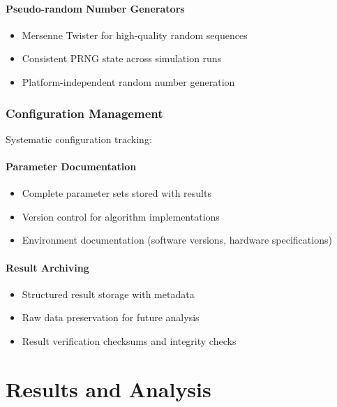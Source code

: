 \subsubsection{Pseudo-random Number Generators}
\begin{itemize}
\item Mersenne Twister for high-quality random sequences
\item Consistent PRNG state across simulation runs
\item Platform-independent random number generation
\end{itemize}

\subsection{Configuration Management}
Systematic configuration tracking:

\subsubsection{Parameter Documentation}
\begin{itemize}
\item Complete parameter sets stored with results
\item Version control for algorithm implementations
\item Environment documentation (software versions, hardware specifications)
\end{itemize}

\subsubsection{Result Archiving}
\begin{itemize}
\item Structured result storage with metadata
\item Raw data preservation for future analysis
\item Result verification checksums and integrity checks
\end{itemize}

\chapter{Results and Analysis}

